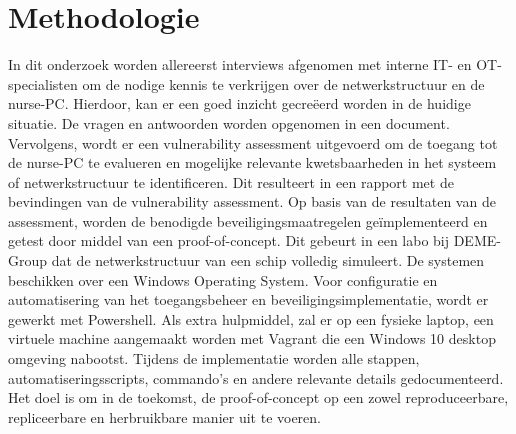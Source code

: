 
\section{Methodologie}%
\label{sec:methodologie}
In dit onderzoek worden allereerst interviews afgenomen met interne IT- en OT-specialisten om de nodige kennis te verkrijgen over de netwerkstructuur en de nurse-PC.
Hierdoor, kan er een goed inzicht gecreëerd worden in de huidige situatie. De vragen en antwoorden worden opgenomen in een document.
Vervolgens, wordt er een vulnerability assessment uitgevoerd om de toegang tot de nurse-PC te evalueren en mogelijke relevante kwetsbaarheden in het systeem of netwerkstructuur te identificeren. 
Dit resulteert in een rapport met de bevindingen van de vulnerability assessment.
Op basis van de resultaten van de assessment, worden de benodigde beveiligingsmaatregelen geïmplementeerd en getest door middel van een proof-of-concept. Dit gebeurt in een labo bij DEME-Group dat de netwerkstructuur van een schip volledig simuleert.  
De systemen beschikken over een Windows Operating System. Voor configuratie en automatisering van het toegangsbeheer en beveiligingsimplementatie, wordt er gewerkt met Powershell. 
Als extra hulpmiddel, zal er op een fysieke laptop, een virtuele machine aangemaakt worden met Vagrant die een Windows 10 desktop omgeving nabootst.
Tijdens de implementatie worden alle stappen, automatiseringsscripts, commando's en andere relevante details gedocumenteerd. Het doel is om in de toekomst, de proof-of-concept op een zowel reproduceerbare, repliceerbare en herbruikbare manier uit te voeren.


